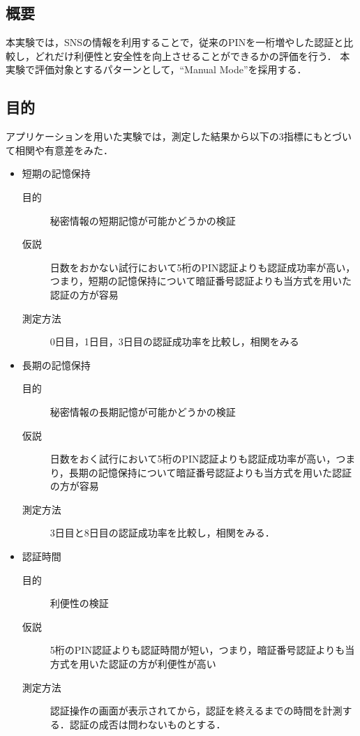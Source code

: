 \subsection{概要}
本実験では，SNSの情報を利用することで，従来のPINを一桁増やした認証と比較し，どれだけ利便性と安全性を向上させることができるかの評価を行う．
本実験で評価対象とするパターンとして，``Manual Mode''を採用する．

\subsection{目的}
アプリケーションを用いた実験では，測定した結果から以下の3指標にもとづいて相関や有意差をみた．
\begin{itemize}
  \item 短期の記憶保持
    \begin{description}
      \item[目的] 秘密情報の短期記憶が可能かどうかの検証
      \item[仮説] 日数をおかない試行において5桁のPIN認証よりも認証成功率が高い，つまり，短期の記憶保持について暗証番号認証よりも当方式を用いた認証の方が容易
      \item[測定方法] 0日目，1日目，3日目の認証成功率を比較し，相関をみる
    \end{description}
  \item 長期の記憶保持
    \begin{description}
      \item[目的] 秘密情報の長期記憶が可能かどうかの検証
      \item[仮説] 日数をおく試行において5桁のPIN認証よりも認証成功率が高い，つまり，長期の記憶保持について暗証番号認証よりも当方式を用いた認証の方が容易
      \item[測定方法] 3日目と8日目の認証成功率を比較し，相関をみる．
    \end{description}
  \item 認証時間
    \begin{description}
      \item[目的] 利便性の検証
      \item[仮説] 5桁のPIN認証よりも認証時間が短い，つまり，暗証番号認証よりも当方式を用いた認証の方が利便性が高い
      \item[測定方法] 認証操作の画面が表示されてから，認証を終えるまでの時間を計測する．認証の成否は問わないものとする．
    \end{description}
\end{itemize}

